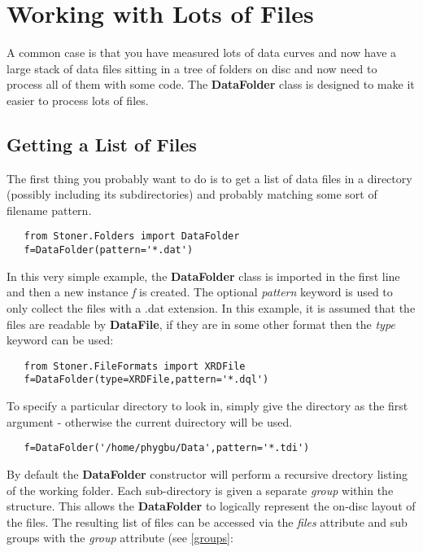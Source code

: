 \documentclass[a4paper,11pt]{scrartcl}
\begin{document}
\section{Working with Lots of Files}\label{DataFolder}

A common case is that you have measured lots of data curves and now have a large stack of data files sitting in a tree of folders on disc and now need to process all of them with some code. The \textbf{DataFolder} class is designed to make it easier to process lots of files.

\subsection{Getting a List of Files}

The first thing you probably want to do is to get a list of data files in a directory (possibly including its subdirectories) and probably matching some sort of filename pattern.

\begin{lstlisting}
   from Stoner.Folders import DataFolder
   f=DataFolder(pattern='*.dat')
\end{lstlisting}

In this very simple example, the \textbf{DataFolder} class is imported in the first line and then a new instance \textit{f} is created. The optional \textit{pattern} keyword is used to only collect the files with a .dat extension. In this example, it is assumed that the files are readable by \textbf{DataFile}, if they are in some other format then the \textit{type} keyword can be used:

\begin{lstlisting}
   from Stoner.FileFormats import XRDFile
   f=DataFolder(type=XRDFile,pattern='*.dql')
\end{lstlisting}

To specify a particular directory to look in, simply give the directory as the first argument - otherwise the current duirectory will be used.

\begin{lstlisting}
   f=DataFolder('/home/phygbu/Data',pattern='*.tdi')
\end{lstlisting}

By default the \textbf{DataFolder} constructor will perform a recursive drectory listing of the working folder. Each sub-directory is given a separate \textit{group} within the structure. This allows the \textbf{DataFolder} to logically represent the on-disc layout of the files. The resulting list of files can be accessed via the \textit{files} attribute and sub groups with the \textit{group} attribute (see \ref{groups}:
\end{document}
